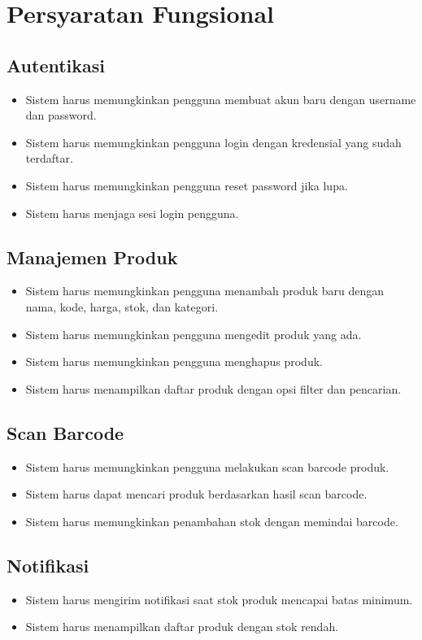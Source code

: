 \documentclass[a4paper,12pt]{article}
\begin{document}
\section{Persyaratan Fungsional}
\subsection{Autentikasi}
\begin{itemize}[leftmargin=1.5cm]
    \item Sistem harus memungkinkan pengguna membuat akun baru dengan username dan password.
    \item Sistem harus memungkinkan pengguna login dengan kredensial yang sudah terdaftar.
    \item Sistem harus memungkinkan pengguna reset password jika lupa.
    \item Sistem harus menjaga sesi login pengguna.
\end{itemize}

\subsection{Manajemen Produk}
\begin{itemize}[leftmargin=1.5cm]
    \item Sistem harus memungkinkan pengguna menambah produk baru dengan nama, kode, harga, stok, dan kategori.
    \item Sistem harus memungkinkan pengguna mengedit produk yang ada.
    \item Sistem harus memungkinkan pengguna menghapus produk.
    \item Sistem harus menampilkan daftar produk dengan opsi filter dan pencarian.
\end{itemize}

\subsection{Scan Barcode}
\begin{itemize}[leftmargin=1.5cm]
    \item Sistem harus memungkinkan pengguna melakukan scan barcode produk.
    \item Sistem harus dapat mencari produk berdasarkan hasil scan barcode.
    \item Sistem harus memungkinkan penambahan stok dengan memindai barcode.
\end{itemize}

\subsection{Notifikasi}
\begin{itemize}[leftmargin=1.5cm]
    \item Sistem harus mengirim notifikasi saat stok produk mencapai batas minimum.
    \item Sistem harus menampilkan daftar produk dengan stok rendah.
\end{itemize}
\end{document}
